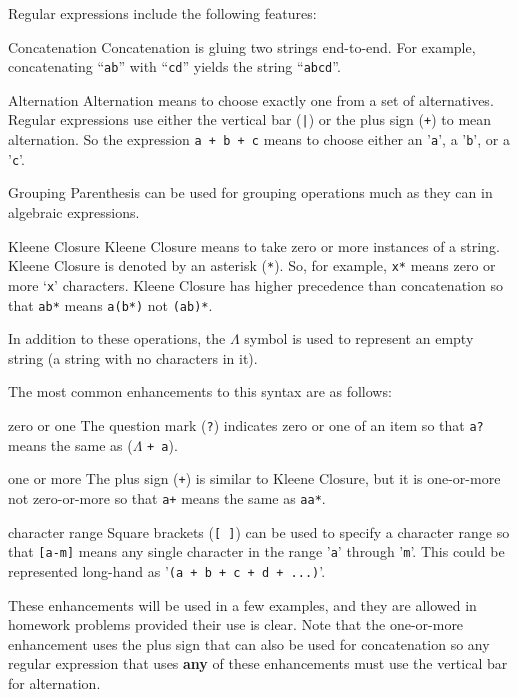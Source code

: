 \documentclass[letterpaper,12pt,openany,reqno]{book}%
\newcommand{\code}[1] {\lstinline[breaklines=yes,breakatwhitespace=yes]{#1}}
\newenvironment{mydesc}[1][9em]
  {
     \begin{basedescript}
     {
      \renewcommand{\makelabel}[1]{\bfseries##1}
      \desclabelwidth{ #1 }
      \desclabelstyle{\multilinelabel}
     }
  }
  {
     \end{basedescript}%
  }
\begin{document}
Regular expressions include the following features:
\begin{mydesc}[10em]
	\item[Concatenation] Concatenation is gluing two strings end-to-end. For example, concatenating ``\code{ab}'' with ``\code{cd}'' yields the string ``\code{abcd}''.
  \item[Alternation] Alternation means to choose exactly one from a set of alternatives. Regular expressions use either the vertical bar (\code{|}) or the plus sign (\code{+}) to mean alternation. So the expression \code{a + b + c} means to choose either an '\code{a}', a '\code{b}', or a '\code{c}'. 
	\item[Grouping] Parenthesis can be used for grouping operations much as they can in algebraic expressions.
	\item[Kleene Closure] Kleene Closure means to take zero or more instances of a string. Kleene Closure is denoted by an asterisk (\code{*}). So, for example, \code{x*} means zero or more `\code{x}' characters. Kleene Closure has higher precedence than concatenation so that \code{ab*} means \code{a(b*)} not \code{(ab)*}.
\end{mydesc}

In addition to these operations, the $\Lambda$ symbol is used to represent an empty string (a string with no characters in it).

The most common enhancements to this syntax are as follows:
\begin{mydesc}
\item[zero or one] The question mark
 (\code{?}) 
indicates zero or one of an item so that \code{a?} 
means the same as ($\Lambda$ \code{+ a}).
\item[one or more] The plus sign (\code{+}) is similar to Kleene Closure, but it is one-or-more not zero-or-more so that \code{a+} means the same as \code{aa*}.
\item[character range] Square brackets (\code{[ ]}) can be used to specify a character range so that \code{[a-m]} means any single character in the range '\code{a}' through '\code{m}'. This could be represented long-hand as '\code{(a + b + c + d + ...)}'.
\end{mydesc}

These enhancements will be used in a few examples, and they are allowed in homework problems provided their use is clear. Note that the one-or-more enhancement uses the plus sign that can also be used for concatenation so any regular expression that uses \textbf{any} of these enhancements must use the vertical bar for alternation.
\end{document}

